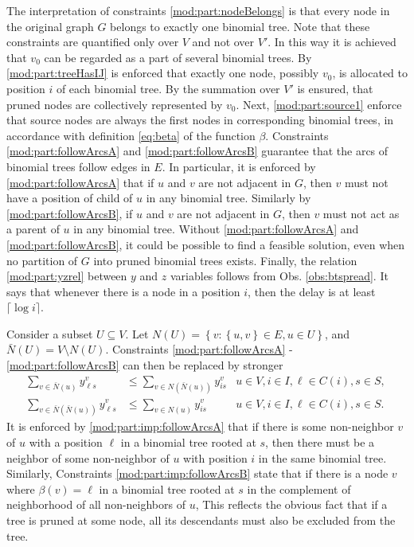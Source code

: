 The interpretation of constraints \eqref{mod:part:nodeBelongs} is that every node in the original graph $G$ belongs to exactly one binomial tree.
Note that these constraints are quantified only over $V$ and not over $V'$.
In this way it is achieved that $v_0$ can be regarded as a part of several binomial trees.
By \eqref{mod:part:treeHasIJ} is enforced that exactly one node, possibly $v_0$, is allocated to position $i$ of each binomial tree.
By the summation over $V'$ is ensured, that pruned nodes are collectively represented by $v_0$.
Next, \eqref{mod:part:source1} enforce that source nodes are always the first nodes in corresponding binomial trees, 
in accordance with definition \eqref{eq:beta} of the function $\beta$.
Constraints \eqref{mod:part:followArcsA} and \eqref{mod:part:followArcsB} guarantee that the arcs of binomial trees follow edges in $E$.
In particular, it is enforced by \eqref{mod:part:followArcsA} that if $u$ and $v$ are not adjacent in $G$, 
then $v$ must not have a position of child of $u$ in any binomial tree.
Similarly by \eqref{mod:part:followArcsB}, if $u$ and $v$ are not adjacent in $G$, then $v$ must not act as a parent of $u$ in any binomial tree.
Without \eqref{mod:part:followArcsA} and \eqref{mod:part:followArcsB}, it could be possible to find a feasible solution, 
even when no partition of $G$ into pruned binomial trees exists.
Finally, the relation \eqref{mod:part:yzrel} between $y$ and $z$ variables follows from Obs. \ref{obs:btspread}.
It says that whenever there is a node in a position $i$, then the delay is at least $\lceil\log i\rceil$.

Consider a subset $U\subseteq V$.
Let $N(U)=\left\{v:\left\{u,v\right\}\in E, u\in U\right\}$, and $\bar{N}(U)=V\setminus N(U)$.
Constraints \eqref{mod:part:followArcsA} - \eqref{mod:part:followArcsB} can then be replaced by stronger
\begin{subequations}\label{mod:partition:imp}
\begin{align}
\label{mod:part:imp:followArcsA}\sum\limits_{v\in \bar{N}(u)}y^v_{\ell s}&\leq \sum\limits_{v\in N(\bar{N}(u))}y_{is}^{v} & u\in V,i\in I,\ell\in C(i), s\in S,  \\
\label{mod:part:imp:followArcsB}\sum\limits_{v\in \bar{N}(\bar{N}(u))}y^v_{\ell s}&\leq \sum\limits_{v\in N(u)} y_{is}^{v} & u\in V,i\in I,\ell\in C(i), s\in S.
\end{align}~
\end{subequations}
It is enforced by \eqref{mod:part:imp:followArcsA} that if there is some  non-neighbor $v$ of $u$  with a position $\ell$ in a binomial tree rooted at $s$,
then there must be a neighbor of some non-neighbor of $u$ with position $i$ in the same binomial tree.
Similarly, Constraints \eqref{mod:part:imp:followArcsB} state 
that if there is a node $v$ where $\beta(v)=\ell$ in a binomial tree rooted at $s$ in the complement of neighborhood of all non-neighbors of $u$,
This reflects the obvious fact that if a tree is pruned at some node, all its descendants must also be excluded from the tree.
